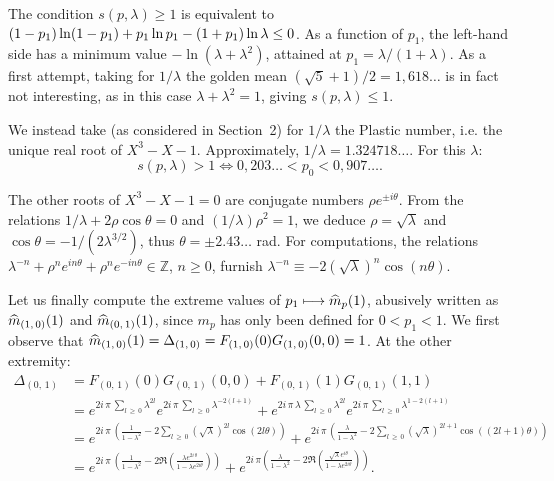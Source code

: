 \documentclass[AHL,Unicode,longabstracts,published]{cedram}
\newcommand{\Zbb}{\mathbb Z}
\let\oldhat\hat
\renewcommand*{\hat}[1]{\mathchoice{\widehat{#1}}{\widehat{#1}}{\oldhat{#1}}{\oldhat{#1}}}
\begin{document}
The condition $s(p,\lambda)\geq1$ is equivalent to $(1-p_1)\ln (1-p_1)+p_1\ln p_1-(1+p_1)\ln\lambda\linebreak\leq0$. As a function of $p_1$, the left-hand side has a minimum value $-\ln(\lambda+\lambda^2)$, attained at $p_1=\lambda/(1+\lambda)$. As a first attempt, taking for $1/\lambda$ the golden mean $(\sqrt{5}+1)/2=1,618\dots$ is in fact not interesting, as in this case $\lambda+\lambda^2=1$, giving $s(p,\lambda)\leq1$.

We instead take (as considered in Section~2) for $1/\lambda$ the Plastic number, i.e. the unique real root of $X^3-X-1$. Approximately, $1/\lambda=1.324718\dots$. For this $\lambda$:
\[
s(p,\lambda)>1\Longleftrightarrow 0,203\dots<p_0<0,907\dots.
\]


The other roots of $X^3-X-1=0$ are conjugate numbers $\rho e^{\pm i\theta}$. From the relations $1/\lambda+2\rho\cos\theta=0$ and $(1/\lambda)\rho^2=1$, we deduce $\rho=\sqrt{\lambda}$ and $\cos\theta=-1/(2\lambda^{3/2})$, thus $\theta=\pm2.43\dots$ rad. For computations, the relations $\lambda^{-n}+\rho^ne^{in\theta}+\rho^ne^{-in\theta}\in\Zbb$, $n\geq0$, furnish $\lambda^{-n}\equiv-2(\sqrt{\lambda})^n\cos(n\theta)$.

Let us finally compute the extreme values of $p_1\longmapsto \hat{m}_p(1)$, abusively written as $\hat{m}_{(1,\,0)}(1)$ and $\hat{m}_{(0,\,1)}(1)$, since $m_p$ has only been defined for $0<p_1<1$. We first observe that $\hat{m}_{(1,\,0)}(1)=\Delta_{(1,\,0)}=F_{(1,\,0)}(0)G_{(1,\,0)}(0,0)=1$. At the other extremity:
\begin{align*}
\Delta_{(0,\,1)}&=F_{(0,\,1)}(0)G_{(0,\,1)}(0,0)+F_{(0,\,1)}(1)G_{(0,\,1)}(1,1)\\
&=e^{2i\,\pi\,\sum_{l\,\geq\,0}\lambda^{2l}}e^{2i\,\pi\,\sum_{l\,\geq\,0}\lambda^{-2(l+1)}}+e^{2i\,\pi\,\lambda\,\sum_{l\,\geq\,0}\lambda^{2l}}e^{2i\,\pi\,\sum_{l\,\geq\,0}\lambda^{1-2(l+1)}}\\
&=e^{2i\,\pi\,\left({\frac{1}{1-\lambda^2}-2\sum_{l\,\geq\,0}\left(\sqrt\lambda\right)^{2l}\cos(2l\theta)}\right)}+e^{2i\,\pi\,\left({\frac{\lambda}{1-\lambda^2}-2\sum_{l\,\geq\,0}\left(\sqrt\lambda\right)^{2l+1}\cos((2l+1)\theta)}\right)}\\
&=e^{2i\,\pi\,\left({\frac{1}{1-\lambda^2}-2\Re\left({\frac{\lambda e^{2i\,\theta}}{1-\lambda e^{2i\theta}}}\right)}\right)}+e^{2i\,\pi\left({\frac{\lambda}{1-\lambda^2}-2\Re\left({\frac{\sqrt{\lambda}e^{i\theta}}{1-\lambda e^{2i\theta}}}\right)}\right)}.
\end{align*}
\end{document}

